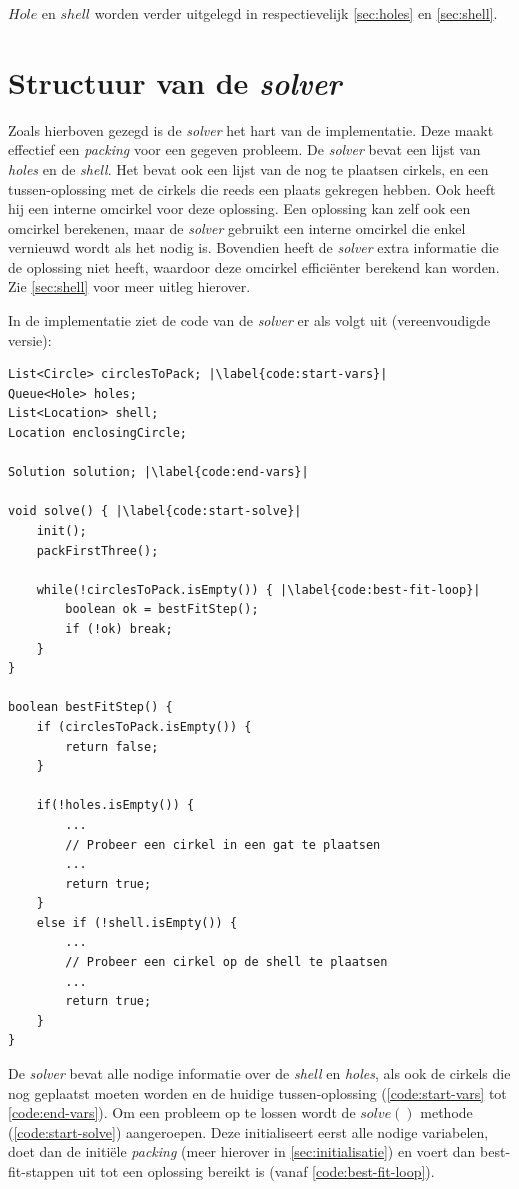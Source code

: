 \documentclass[12pt,a4paper,oneside]{book}
\begin{document}
$Hole$ en $shell$ worden verder uitgelegd in respectievelijk \autoref{sec:holes} en \autoref{sec:shell}.

\section{Structuur van de \textit{solver}}

Zoals hierboven gezegd is de \textit{solver} het hart van de implementatie.
Deze maakt effectief een \textit{packing} voor een gegeven probleem.
De \textit{solver} bevat een lijst van \textit{holes} en de \textit{shell}.
Het bevat ook een lijst van de nog te plaatsen cirkels, en een tussen-oplossing met de cirkels die reeds een plaats gekregen hebben.
Ook heeft hij een interne omcirkel voor deze oplossing.
Een oplossing kan zelf ook een omcirkel berekenen, maar de \textit{solver} gebruikt een interne omcirkel die enkel vernieuwd wordt als het nodig is.
Bovendien heeft de \textit{solver} extra informatie die de oplossing niet heeft, waardoor deze omcirkel efficiënter berekend kan worden.
Zie \autoref{sec:shell} voor meer uitleg hierover.

In de implementatie ziet de code van de \textit{solver} er als volgt uit (vereenvoudigde versie):

\begin{lstlisting}
List<Circle> circlesToPack; |\label{code:start-vars}|
Queue<Hole> holes;
List<Location> shell;
Location enclosingCircle;

Solution solution; |\label{code:end-vars}|

void solve() { |\label{code:start-solve}|
	init();
	packFirstThree();
	
	while(!circlesToPack.isEmpty()) { |\label{code:best-fit-loop}|
		boolean ok = bestFitStep();
		if (!ok) break;
	}
}

boolean bestFitStep() {
	if (circlesToPack.isEmpty()) {
		return false;
	}
	
	if(!holes.isEmpty()) {
		...
		// Probeer een cirkel in een gat te plaatsen
		...
		return true;
	}
	else if (!shell.isEmpty()) {
		...
		// Probeer een cirkel op de shell te plaatsen
		...
		return true;
	}
}
\end{lstlisting}

De \textit{solver} bevat alle nodige informatie over de \textit{shell} en \textit{holes}, als ook de cirkels die nog geplaatst moeten worden en de huidige tussen-oplossing (\autoref{code:start-vars} tot \autoref{code:end-vars}).
Om een probleem op te lossen wordt de $solve()$ methode (\autoref{code:start-solve}) aangeroepen.
Deze initialiseert eerst alle nodige variabelen, doet dan de initiële \textit{packing} (meer hierover in \autoref{sec:initialisatie}) en voert dan best-fit-stappen uit tot een oplossing bereikt is (vanaf \autoref{code:best-fit-loop}).
\end{document}
